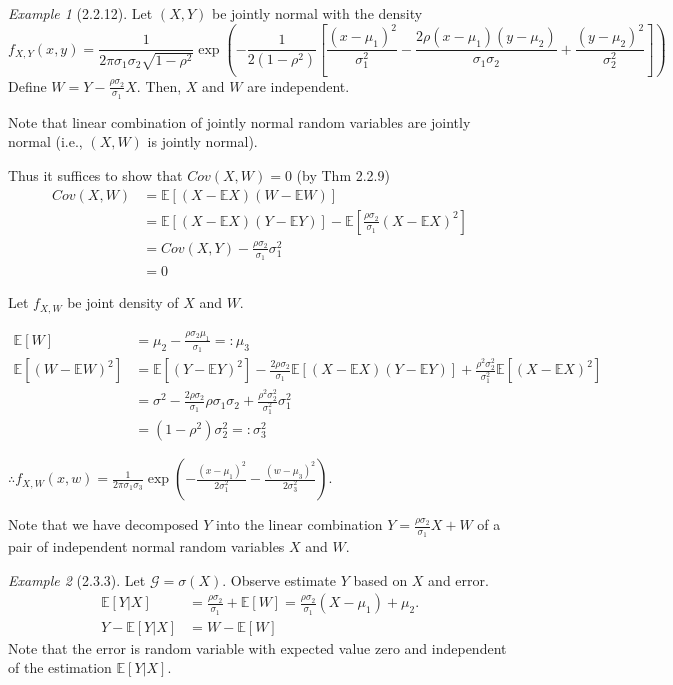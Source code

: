 \documentclass[12pt]{report}
\renewcommand{\1}{\mathbb{1}}
\theoremstyle{break}
\theoremstyle{newdef}
\theoremstyle{remark}
\newtheorem*{exmp}{Example} %
\begin{document}
\begin{appendices}
\begin{exmp}[2.2.12]
Let $(X,Y)$ be jointly normal with the density
$$
f_{X,Y}(x,y) = \frac{1}{2\pi \sigma_1\sigma_2 \sqrt{1-\rho^2}}
\exp \left(-\frac{1}{2(1-\rho^2)} \left[\frac{(x-\mu_1)^2}{\sigma_1^2} - \frac{2\rho(x-\mu_1)(y-\mu_2)}{\sigma_1\sigma_2} + \frac{(y-\mu_2)^2}{\sigma_2^2}\right]\right)$$
Define $W = Y - \frac{\rho\sigma_2}{\sigma_1} X$.
Then, $X$ and $W$ are independent.

Note that linear combination of jointly normal random variables are jointly normal
(i.e., $(X,W)$ is jointly normal).

Thus it suffices to show that $Cov(X,W) = 0$ (by Thm 2.2.9)
$$
\begin{aligned}
Cov(X,W) &= \mathbb{E}[(X-\mathbb{E}X)(W-\mathbb{E}W)]\\
&= \mathbb{E}[(X-\mathbb{E}X)(Y-\mathbb{E}Y)] - \mathbb{E}[\frac{\rho\sigma_2}{\sigma_1}(X-\mathbb{E}X)^2]\\
&= Cov(X,Y) - \frac{\rho\sigma_2}{\sigma_1}\sigma_1^2\\
&= 0
\end{aligned}
$$

Let $f_{X,W}$ be joint density of $X$ and $W$.

$$
\begin{aligned}
\mathbb{E}[W] &= \mu_2 - \frac{\rho\sigma_2\mu_1}{\sigma_1} =: \mu_3\\
\mathbb{E}[(W-\mathbb{E}W)^2] &= \mathbb{E}[(Y-\mathbb{E}Y)^2] - \frac{2\rho\sigma_2}{\sigma_1}\mathbb{E}[(X-\mathbb{E}X)(Y-\mathbb{E}Y)] + \frac{\rho^2\sigma_2^2}{\sigma_1^2}\mathbb{E}[(X-\mathbb{E}X)^2]\\
&= \sigma^2 - \frac{2\rho\sigma_2}{\sigma_1}\rho\sigma_1\sigma_2 + \frac{\rho^2\sigma_2^2}{\sigma_1^2}\sigma_1^2\\
&=(1-\rho^2)\sigma_2^2 =: \sigma_3^2
\end{aligned}
$$

$\therefore f_{X,W}(x,w) = \frac{1}{2\pi\sigma_1\sigma_3} \exp\left(-\frac{(x-\mu_1)^2}{2\sigma_1^2} - \frac{(w-\mu_3)^2}{2\sigma_3^2}\right)$.

Note that we have decomposed $Y$ into the linear combination $Y = \frac{\rho\sigma_2}{\sigma_1}X + W$ of a pair of independent normal random variables $X$ and $W$.

\end{exmp}

\vspace{5mm}

\begin{exmp}[2.3.3]
Let $\mathcal{G} = \sigma(X)$. Observe estimate $Y$ based on $X$ and error.
$$
\begin{aligned}
\mathbb{E}[Y|X] &= \frac{\rho\sigma_2}{\sigma_1} + \mathbb{E}[W] = \frac{\rho\sigma_2}{\sigma_1}(X-\mu_1) + \mu_2.\\
Y-\mathbb{E}[Y|X] &= W - \mathbb{E}[W]
\end{aligned}
$$
Note that the error is random variable with expected value zero and independent of the estimation $\mathbb{E}[Y|X]$.
\end{exmp}



\end{appendices}
\end{document}

